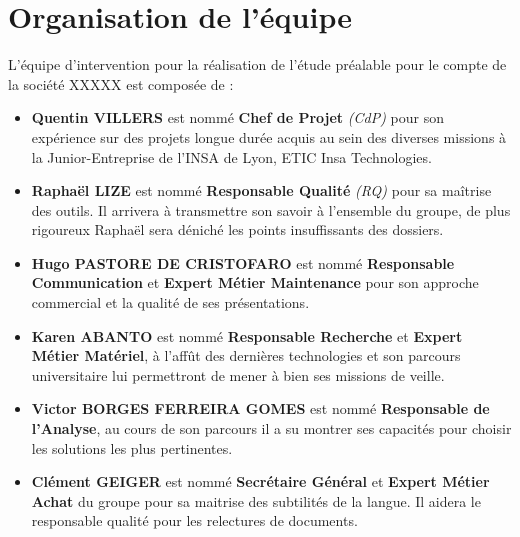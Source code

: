 \section{Organisation de l'équipe}

L'équipe d'intervention pour la réalisation de l'étude préalable pour le compte de la société XXXXX est composée de : 

\begin{itemize}
\item \textbf{Quentin VILLERS} est nommé \textbf{ Chef de Projet} {\it (CdP)} pour son expérience sur des projets longue durée acquis au sein des diverses missions à la Junior-Entreprise de l'INSA de Lyon, ETIC Insa Technologies.
\item \textbf{Raphaël LIZE} est nommé \textbf{ Responsable Qualité} {\it (RQ)} pour sa maîtrise des outils. Il arrivera à transmettre son savoir à l'ensemble du groupe, de plus rigoureux Raphaël sera déniché les points insuffissants des dossiers. 
\item \textbf{Hugo PASTORE DE CRISTOFARO} est nommé \textbf{Responsable Communication} et \textbf{Expert Métier Maintenance} pour son approche commercial et la qualité de ses présentations. 
\item \textbf{Karen ABANTO} est nommé \textbf{ Responsable Recherche} et \textbf{Expert Métier Matériel}, à l'affût des dernières technologies et son parcours universitaire lui permettront de mener à bien ses missions de veille.
\item \textbf{Victor BORGES FERREIRA GOMES} est nommé \textbf{Responsable de l'Analyse}, au cours de son parcours il a su montrer ses capacités pour choisir les solutions les plus pertinentes.
\item \textbf{Clément GEIGER} est nommé \textbf{Secrétaire Général} et \textbf{Expert Métier Achat} du groupe pour sa maitrise des subtilités de la langue. Il aidera le responsable qualité pour les relectures de documents.  
\end{itemize}
